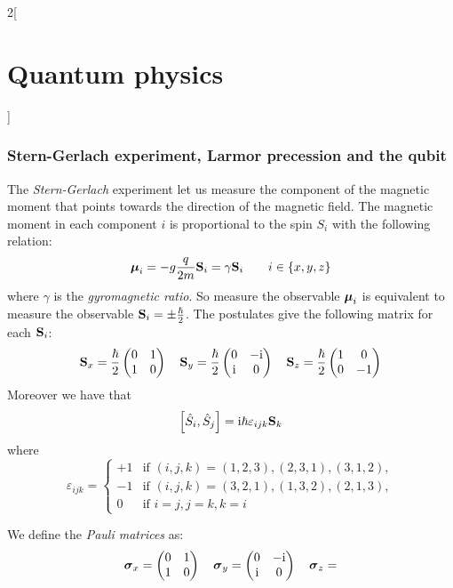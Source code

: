 \documentclass[../../../main_physics.tex]{subfiles}
\begin{document}
\begin{multicols}{2}[\section{Quantum physics}]
  \subsubsection{Stern-Gerlach experiment, Larmor precession and the qubit}
  \begin{proposition}
    The \emph{Stern-Gerlach} experiment let us measure the component of the magnetic moment that points towards the direction of the magnetic field. The magnetic moment in each component $i$ is proportional to the spin $S_i$ with the following relation:
    $$\boldsymbol{\mathrm{\mu}}_i=-g\frac{q}{2 m} \boldsymbol{\mathrm{S}}_i=\gamma\boldsymbol{\mathrm{S}}_i\qquad i\in\{x,y,z\}$$
    where $\gamma$ is the \emph{gyromagnetic ratio}. So measure the observable $\boldsymbol{\mathrm{\mu}}_i$ is equivalent to measure the observable $\boldsymbol{\mathrm{S}}_i=\pm\frac{\hbar}{2}$. The postulates give the following matrix for each $\boldsymbol{\mathrm{S}}_i$: $$\boldsymbol{\mathrm{S}}_x=\frac{\hbar}{2}
      \begin{pmatrix}
        0 & 1 \\
        1 & 0
      \end{pmatrix}\quad\boldsymbol{\mathrm{S}}_y=\frac{\hbar}{2}
      \begin{pmatrix}
        0   & -\mathrm{i} \\
        \mathrm{i} & 0
      \end{pmatrix}\quad\boldsymbol{\mathrm{S}}_z=\frac{\hbar}{2}
      \begin{pmatrix}
        1 & 0  \\
        0 & -1
      \end{pmatrix}$$
    Moreover we have that $$\comm{\hat{S}_i}{\hat{S}_j}=\ii\hbar\varepsilon_{ijk}\vf{S}_k$$ where $$\varepsilon_{ijk}=
      \begin{cases}
        +1 & \text{if } (i,j,k) =(1,2,3), (2,3,1), (3,1,2), \\
        -1 & \text{if } (i,j,k) =(3,2,1), (1,3,2), (2,1,3), \\
        0  & \text{if } i = j, j = k, k = i
      \end{cases}$$
  \end{proposition}
  \begin{definition}
    We define the \emph{Pauli matrices} as: $$\boldsymbol{\mathrm{\sigma}}_x=
      \begin{pmatrix}
        0 & 1 \\
        1 & 0
      \end{pmatrix}\quad\boldsymbol{\mathrm{\sigma}}_y=
      \begin{pmatrix}
        0   & -\mathrm{i} \\
        \mathrm{i} & 0
      \end{pmatrix}\quad\boldsymbol{\mathrm{\sigma}}_z=
$$
\end{definition}
\end{multicols}
\end{document}
